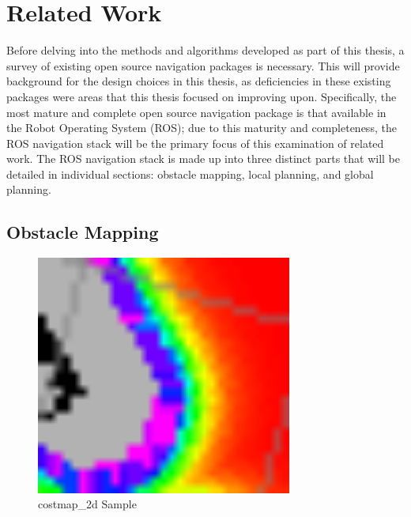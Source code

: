 \section{Related Work}\label{sec:related_work}

Before delving into the methods and algorithms developed as part of this thesis, a survey of existing open source navigation packages is necessary. This will provide background for the design choices in this thesis, as deficiencies in these existing packages were areas that this thesis focused on improving upon. Specifically, the most mature and complete open source navigation package is that available in the Robot Operating System (ROS)\autocite{Marder-Eppstein2010}; due to this maturity and completeness, the ROS navigation stack will be the primary focus of this examination of related work. The ROS navigation stack is made up into three distinct parts that will be detailed in individual sections: obstacle mapping, local planning, and global planning.

\subsection{Obstacle Mapping}\label{subsec:costmap_2d}

\begin{figure}
\centering
\includegraphics[width=0.75\textwidth]{images/costmap_2d_costgradient}
\caption{costmap\_2d Sample \label{fig:costmap_2d_costgradient}}
\end{figure}

